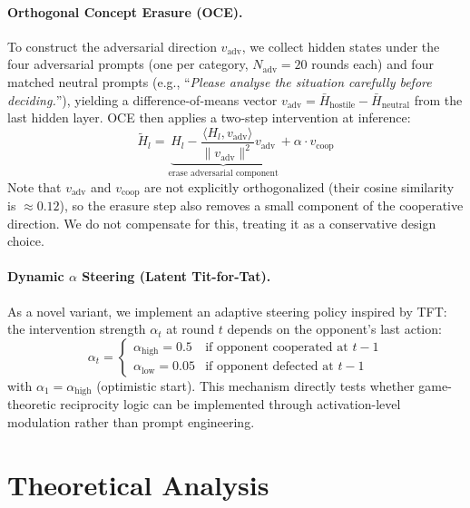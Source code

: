 \documentclass{article}
\begin{document}
\paragraph{Orthogonal Concept Erasure (OCE).} To construct the adversarial direction $v_\text{adv}$, we collect hidden states under the four adversarial prompts (one per category, $N_\text{adv} = 20$ rounds each) and four matched neutral prompts (e.g., ``\textit{Please analyse the situation carefully before deciding.}''), yielding a difference-of-means vector $v_\text{adv} = \bar{H}_\text{hostile} - \bar{H}_\text{neutral}$ from the last hidden layer. OCE then applies a two-step intervention at inference:
\begin{equation}
    \tilde{H}_l = \underbrace{H_l - \frac{\langle H_l, v_\text{adv}\rangle}{\|v_\text{adv}\|^2} v_\text{adv}}_{\text{erase adversarial component}} + \alpha \cdot v_\text{coop}
    \label{eq:oce}
\end{equation}
Note that $v_\text{adv}$ and $v_\text{coop}$ are not explicitly orthogonalized (their cosine similarity is $\approx 0.12$), so the erasure step also removes a small component of the cooperative direction. We do not compensate for this, treating it as a conservative design choice.

\paragraph{Dynamic $\alpha$ Steering (Latent Tit-for-Tat).} As a novel variant, we implement an adaptive steering policy inspired by TFT: the intervention strength $\alpha_t$ at round $t$ depends on the opponent's last action:
\begin{equation}
    \alpha_t = \begin{cases} \alpha_\text{high} = 0.5 & \text{if opponent cooperated at } t-1 \\ \alpha_\text{low} = 0.05 & \text{if opponent defected at } t-1 \end{cases}
    \label{eq:dyn_alpha}
\end{equation}
with $\alpha_1 = \alpha_\text{high}$ (optimistic start). This mechanism directly tests whether game-theoretic reciprocity logic can be implemented through activation-level modulation rather than prompt engineering.


\section{Theoretical Analysis}
\label{sec:theory}
\end{document}
